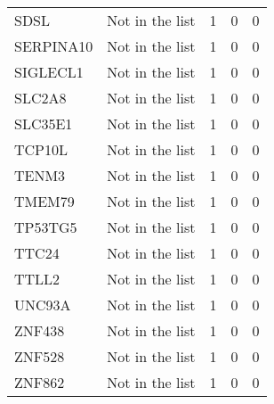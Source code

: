 \documentclass[12pt,twoside]{reedthesis}
\theoremstyle{definition}
\theoremstyle{definition}
\theoremstyle{remark}
\begin{document}
\begin{longtable}[t]{llrrr}
  SDSL & Not in the list & 1 & 0 & 0\\
  SERPINA10 & Not in the list & 1 & 0 & 0\\
  SIGLECL1 & Not in the list & 1 & 0 & 0\\
  SLC2A8 & Not in the list & 1 & 0 & 0\\
  \addlinespace
  SLC35E1 & Not in the list & 1 & 0 & 0\\
  TCP10L & Not in the list & 1 & 0 & 0\\
  TENM3 & Not in the list & 1 & 0 & 0\\
  TMEM79 & Not in the list & 1 & 0 & 0\\
  TP53TG5 & Not in the list & 1 & 0 & 0\\
  \addlinespace
  TTC24 & Not in the list & 1 & 0 & 0\\
  TTLL2 & Not in the list & 1 & 0 & 0\\
  UNC93A & Not in the list & 1 & 0 & 0\\
  ZNF438 & Not in the list & 1 & 0 & 0\\
  ZNF528 & Not in the list & 1 & 0 & 0\\
  ZNF862 & Not in the list & 1 & 0 & 0\\
  \bottomrule
  \end{longtable}
  
  \newpage
  
\end{document}
